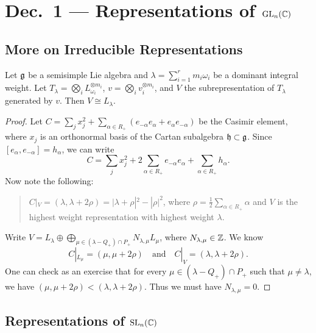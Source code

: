 \chapter{Dec.~1 --- Representations of \texorpdfstring{$\operatorname{GL}_n(\mathbb{C})$}{GL(n, C)}}

\section{More on Irreducible Representations}
\begin{prop}
  Let $\mathfrak{g}$ be a semisimple Lie algebra
  and $\lambda = \sum_{i = 1}^r m_i \omega_i$
  be a dominant integral weight.
  Let $T_\lambda = \bigotimes_i L_{\omega_i}^{\otimes m_i}$,
  $v = \bigotimes_i v_i^{\otimes m_i}$,
  and $V$ the subrepresentation
  of $T_\lambda$ generated by $v$.
  Then $V \cong L_\lambda$.
\end{prop}

\begin{proof}
  Let $C = \sum_j x_j^2 + \sum_{\alpha \in R_+} (e_{-\alpha} e_\alpha + e_\alpha e_{-\alpha})$
  be the Casimir element, where
  $x_j$ is an orthonormal basis
  of the Cartan subalgebra
  $\mathfrak{h} \subset \mathfrak{g}$. Since
  $[e_\alpha, e_{-\alpha}] = h_\alpha$,
  we can write
  \[
    C = \sum_j x_j^2 + 2\sum_{\alpha \in R_+} e_{-\alpha} e_\alpha
    + \sum_{\alpha \in R_+} h_\alpha.
  \]
  Now note the following:
  \begin{quote}
    \vspace{-2em}
    \begin{lemma}
      $C|_V = (\lambda, \lambda + 2\rho) = |\lambda + \rho|^2 - |\rho|^2$,
      where $\rho = \frac{1}{2} \sum_{\alpha \in R_+} \alpha$ and
      $V$ is the highest weight representation
      with highest weight $\lambda$.
    \end{lemma}
  \end{quote}
  Write
  $V = L_\lambda \oplus \bigoplus_{\mu \in (\lambda - Q_+) \cap P_+} N_{\lambda, \mu} L_\mu$,
  where $N_{\lambda, \mu} \in \mathbb{Z}$. We
  know
  \[
    C|_{L_\mu} = (\mu, \mu + 2\rho)
    \quad \text{and} \quad
    C|_V = (\lambda, \lambda + 2\rho).
  \]
  One can check as an exercise that
  for every $\mu \in (\lambda - Q_+) \cap P_+$
  such that $\mu \ne \lambda$, we have
  $(\mu, \mu + 2\rho) < (\lambda, \lambda + 2\rho)$.
  Thus we must have $N_{\lambda, \mu} = 0$.
\end{proof}

\section{Representations of \texorpdfstring{$\operatorname{SL}_n(\mathbb{C})$}{SL(n, C)}}

